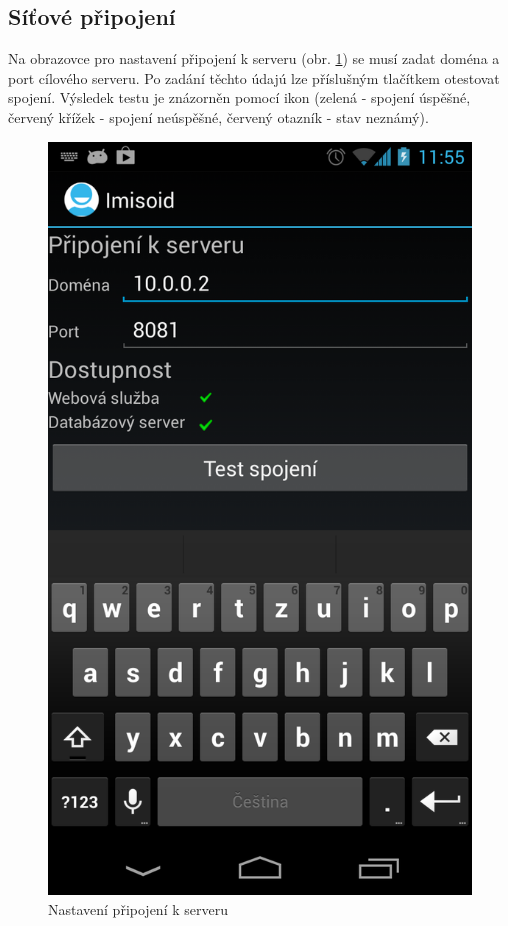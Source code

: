 \documentclass{diplomka}
\begin{document}
\newpage
\subsection{Síťové připojení}
\label{sec:network}
Na obrazovce pro nastavení připojení k serveru (obr. \ref{fig:network}) se musí zadat doména a port cílového serveru. Po zadání těchto údajú lze příslušným tlačítkem otestovat spojení. Výsledek testu je znázorněn pomocí ikon (zelená - spojení úspěšné, červený křížek - spojení neúspěšné, červený otazník - stav neznámý).

\begin{figure}[H]
  \centering
  \includegraphics[scale=0.25]{scr/network.png}
    \caption{Nastavení připojení k serveru}
  \label{fig:network}
\end{figure}
\end{document}
